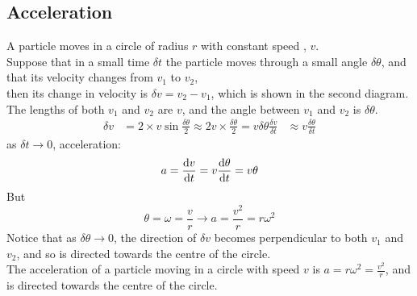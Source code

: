 \documentclass[a4paper]{article}
\begin{document}
\subsection{Acceleration}
A particle moves in a circle of radius $r$ with constant speed , $v$.\\

Suppose that in a small time $\delta t$ the particle moves through a small angle $\delta\theta$, and that its velocity changes from $v_1$ to $v_2$, \\

then its change in velocity is $\delta v =v_2-v_1$, which is shown in the second diagram. \\

The lengths of both $v_1$ and $v_2$ are $v$, and the angle between $v_1$ and $v_2$ is $\delta\theta$.
\begin{align*}
	\delta v                  & = 2\times v \sin \frac{\delta\theta}{2}\approx 2v\times\frac{\delta\theta}{2}=v\delta\theta
	\frac{\delta v}{\delta t} & \approx v\frac{\delta\theta}{\delta t}
\end{align*}
as $\delta t \rightarrow 0 $, acceleration:
\[
	a=\frac{\mathrm{d} v}{\mathrm{d} t}=v\frac{\mathrm{d} \theta}{\mathrm{d} t}=v\theta
\]
But
\[
	\theta=\omega=\frac{v}{r} \rightarrow a = \frac{v^2}{r}=r\omega^2
\]
Notice that as $\delta\theta \rightarrow 0$, the direction of $\delta v$ becomes perpendicular to both $v_1$ and $v_2$, and so is directed towards the centre of the circle.\\

The acceleration of a particle moving in a circle with speed $v$ is $a=r\omega^2=\frac{v^2}{r}$, and is directed towards the centre of the circle.\\
\end{document}
